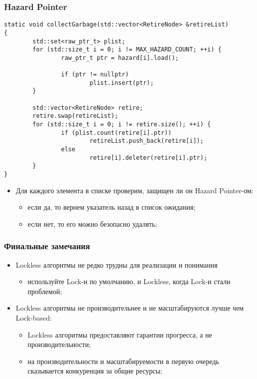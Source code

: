 \begin{frame}[fragile]
\frametitle{Hazard Pointer}

\begin{lstlisting}
static void collectGarbage(std::vector<RetireNode> &retireList)
{
        std::set<raw_ptr_t> plist;
        for (std::size_t i = 0; i != MAX_HAZARD_COUNT; ++i) {
                raw_ptr_t ptr = hazard[i].load();

                if (ptr != nullptr)
                        plist.insert(ptr);
        }

        std::vector<RetireNode> retire;
        retire.swap(retireList);
        for (std::size_t i = 0; i != retire.size(); ++i) {
                if (plist.count(retire[i].ptr))
                        retireList.push_back(retire[i]);
                else
                        retire[i].deleter(retire[i].ptr);
        }
}
\end{lstlisting}

\begin{itemize}
  \item Для каждого элемента в списке проверим, защищен ли он Hazard Pointer-ом:
    \begin{itemize}
      \item если да, то вернем указатель назад в список ожидания;
      \item если нет, то его можно безопасно удалять;
    \end{itemize}
\end{itemize}
\end{frame}

\begin{frame}
\frametitle{Финальные замечания}

\begin{itemize}
  \item Lockless алгоритмы не редко трудны для реализации и понимания
    \begin{itemize}
      \item используйте Lock-и по умолчанию, и Lockless, когда Lock-и стали проблемой;
    \end{itemize}
  \item Lockless алгоритмы не производительнее и не масштабируются лучше чем Lock-based:
    \begin{itemize}
      \item Lockless алгоритмы предоставляют гарантии прогресса, а не производительности;
      \item на производительности и масштабируемости в первую очередь сказывается конкуренция за общие ресурсы;
    \end{itemize}
\end{itemize}
\end{frame}

